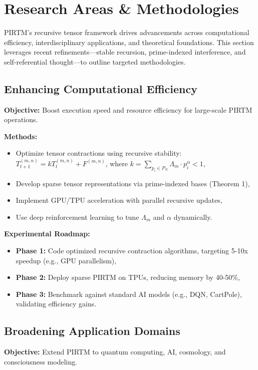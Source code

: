 \documentclass{article}
\theoremstyle{plain}
\begin{document}
\section{Research Areas \& Methodologies}
\label{sec:research_areas}

PIRTM’s recursive tensor framework drives advancements across computational efficiency, interdisciplinary applications, and theoretical foundations. This section leverages recent refinements—stable recursion, prime-indexed interference, and self-referential thought—to outline targeted methodologies.

\subsection{Enhancing Computational Efficiency}
\textbf{Objective:} Boost execution speed and resource efficiency for large-scale PIRTM operations.

\textbf{Methods:}
\begin{itemize}
    \item Optimize tensor contractions using recursive stability: \( T_{t+1}^{(m,n)} = k T_t^{(m,n)} + F^{(m,n)} \), where \( k = \sum_{p_i \in P_N} \Lambda_m \cdot p_i^\alpha < 1 \),
    \item Develop sparse tensor representations via prime-indexed bases (Theorem 1),
    \item Implement GPU/TPU acceleration with parallel recursive updates,
    \item Use deep reinforcement learning to tune \( \Lambda_m \) and \( \alpha \) dynamically.
\end{itemize}

\textbf{Experimental Roadmap:}
\begin{itemize}
    \item \textbf{Phase 1:} Code optimized recursive contraction algorithms, targeting 5-10x speedup (e.g., GPU parallelism),
    \item \textbf{Phase 2:} Deploy sparse PIRTM on TPUs, reducing memory by 40-50\%,
    \item \textbf{Phase 3:} Benchmark against standard AI models (e.g., DQN, CartPole), validating efficiency gains.
\end{itemize}

\subsection{Broadening Application Domains}
\textbf{Objective:} Extend PIRTM to quantum computing, AI, cosmology, and consciousness modeling.
\end{document}
